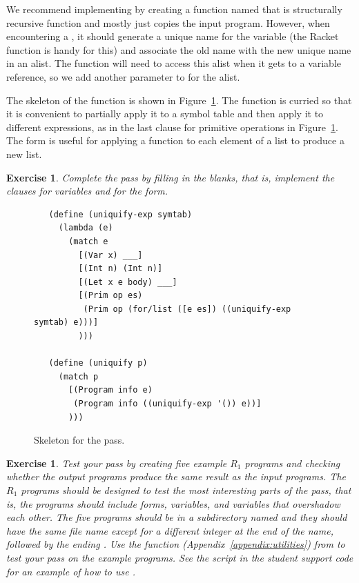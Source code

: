 \documentclass[11pt]{book}
\newtheorem{exercise}[theorem]{Exercise}
\begin{document}
We recommend implementing  by creating a function named
 that is structurally recursive function and mostly
just copies the input program. However, when encountering a ,
it should generate a unique name for the variable (the Racket function
 is handy for this) and associate the old name with the
new unique name in an alist. The 
function will need to access this alist when it gets to a
variable reference, so we add another parameter to 
for the alist.


The skeleton of the  function is shown in
Figure~\ref{fig:uniquify-s0}.  The function is curried so that it is
convenient to partially apply it to a symbol table and then apply it
to different expressions, as in the last clause for primitive
operations in Figure~\ref{fig:uniquify-s0}.  The  form
is useful for applying a function to each element of a list to produce
a new list.


\begin{exercise}
\normalfont %

Complete the  pass by filling in the blanks, that is,
implement the clauses for variables and for the  form.
\end{exercise}

\begin{figure}[tbp]
\begin{lstlisting}
   (define (uniquify-exp symtab)
     (lambda (e)
       (match e
         [(Var x) ___]
         [(Int n) (Int n)]
         [(Let x e body) ___]
         [(Prim op es)
          (Prim op (for/list ([e es]) ((uniquify-exp symtab) e)))]
         )))

   (define (uniquify p)
     (match p
       [(Program info e)
        (Program info ((uniquify-exp '()) e))]
       )))
\end{lstlisting}
\caption{Skeleton for the  pass.}
\label{fig:uniquify-s0}
\end{figure}

\begin{exercise}
\normalfont %

Test your  pass by creating five example $R_1$ programs
and checking whether the output programs produce the same result as
the input programs. The $R_1$ programs should be designed to test the
most interesting parts of the  pass, that is, the
programs should include  forms, variables, and variables
that overshadow each other.  The five programs should be in a
subdirectory named  and they should have the same file name
except for a different integer at the end of the name, followed by the
ending .  Use the  function
(Appendix~\ref{appendix:utilities}) from  to test
your  pass on the example programs.  See the
 script in the student support code for an example
of how to use .

\end{exercise}
\end{document}
